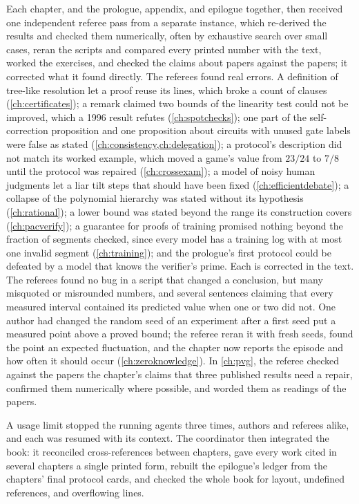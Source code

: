 Each chapter, and the prologue, appendix, and epilogue together, then received one independent referee pass from a separate instance, which re-derived the results and checked them numerically, often by exhaustive search over small cases, reran the scripts and compared every printed number with the text, worked the exercises, and checked the claims about papers against the papers; it corrected what it found directly. The referees found real errors. A definition of tree-like resolution let a proof reuse its lines, which broke a count of clauses (\cref{ch:certificates}); a remark claimed two bounds of the linearity test could not be improved, which a 1996 result refutes (\cref{ch:spotchecks}); one part of the self-correction proposition and one proposition about circuits with unused gate labels were false as stated (\cref{ch:consistency,ch:delegation}); a protocol's description did not match its worked example, which moved a game's value from $23/24$ to $7/8$ until the protocol was repaired (\cref{ch:crossexam}); a model of noisy human judgments let a liar tilt steps that should have been fixed (\cref{ch:efficientdebate}); a collapse of the polynomial hierarchy was stated without its hypothesis (\cref{ch:rational}); a lower bound was stated beyond the range its construction covers (\cref{ch:pacverify}); a guarantee for proofs of training promised nothing beyond the fraction of segments checked, since every model has a training log with at most one invalid segment (\cref{ch:training}); and the prologue's first protocol could be defeated by a model that knows the verifier's prime. Each is corrected in the text. The referees found no bug in a script that changed a conclusion, but many misquoted or misrounded numbers, and several sentences claiming that every measured interval contained its predicted value when one or two did not. One author had changed the random seed of an experiment after a first seed put a measured point above a proved bound; the referee reran it with fresh seeds, found the point an expected fluctuation, and the chapter now reports the episode and how often it should occur (\cref{ch:zeroknowledge}). In \cref{ch:pvg}, the referee checked against the papers the chapter's claims that three published results need a repair, confirmed them numerically where possible, and worded them as readings of the papers.

A usage limit stopped the running agents three times, authors and referees alike, and each was resumed with its context. The coordinator then integrated the book: it reconciled cross-references between chapters, gave every work cited in several chapters a single printed form, rebuilt the epilogue's ledger from the chapters' final protocol cards, and checked the whole book for layout, undefined references, and overflowing lines.

